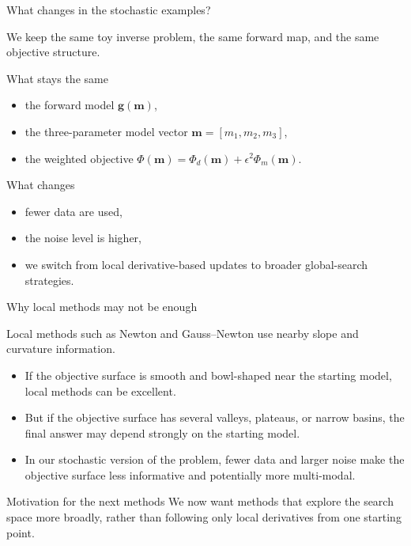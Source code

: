 \documentclass[aspectratio=169]{beamer}
\renewcommand{\vec}[1]{\mathbf{#1}}
\newcommand{\mm}{ {\vec{m}} }
\renewcommand{\gg}[1]{\vec{g}\left(#1\right)}
\begin{document}
\begin{frame}{What changes in the stochastic examples?}
\small

We keep the \alert{same toy inverse problem}, the same forward map, and the same objective structure.

\begin{block}{What stays the same}
\begin{itemize}
    \item[--] the forward model $\gg{\mm}$,
    \item[--] the three-parameter model vector $\mm=[m_1,m_2,m_3]$,
    \item[--] the weighted objective $\Phi(\mm)=\Phi_d(\mm)+\epsilon^2\Phi_m(\mm)$.
\end{itemize}
\end{block}

\begin{alertblock}{What changes}
\begin{itemize}
    \item[--] fewer data are used,
    \item[--] the noise level is higher,
    \item[--] we switch from local derivative-based updates to broader global-search strategies.
\end{itemize}
\end{alertblock}
\end{frame}

\begin{frame}{Why local methods may not be enough}
\small

Local methods such as Newton and Gauss--Newton use \alert{nearby slope and curvature} information.

\vspace{0.15cm}

\begin{itemize}
    \item[--] If the objective surface is smooth and bowl-shaped near the starting model, local methods can be excellent.
    \item[--] But if the objective surface has several valleys, plateaus, or narrow basins, the final answer may depend strongly on the starting model.
    \item[--] In our stochastic version of the problem, fewer data and larger noise make the objective surface less informative and potentially more multi-modal.
\end{itemize}

\begin{alertblock}{Motivation for the next methods}
We now want methods that \alert{explore the search space more broadly}, rather than following only local derivatives from one starting point.
\end{alertblock}
\end{frame}
\end{document}
